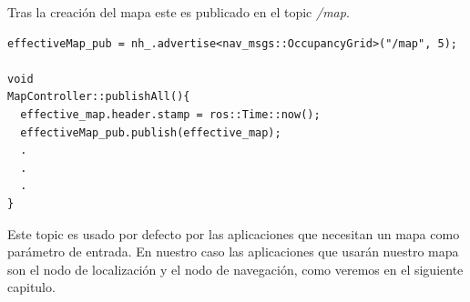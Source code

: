 Tras la creación del mapa este es publicado en el topic \textit{/map}. 

\begin{lstlisting}[caption=Publicación del mapa final, label={lst:effectivemappublish}]
effectiveMap_pub = nh_.advertise<nav_msgs::OccupancyGrid>("/map", 5);

void
MapController::publishAll(){
  effective_map.header.stamp = ros::Time::now();
  effectiveMap_pub.publish(effective_map);
  .
  .
  .
}
\end{lstlisting}


Este topic es usado por defecto por las aplicaciones que necesitan un mapa como parámetro de entrada. En nuestro caso las aplicaciones que usarán nuestro mapa son el nodo de localización y el nodo de navegación, como veremos en el siguiente capitulo. 